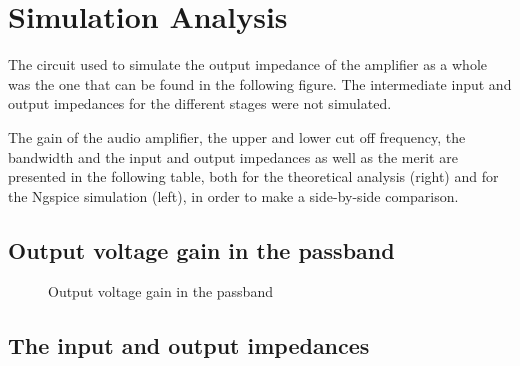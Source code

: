 \section{Simulation Analysis}
\label{sec:simulation}

The circuit used to simulate the output impedance of the amplifier as a whole was the one that can be found in the following figure. The intermediate input and output impedances for the different stages were not simulated.



The gain of the audio amplifier, the upper and lower cut off frequency, the bandwidth and the input and output impedances as well as the merit are presented in the following table, both for the theoretical analysis (right) and for the Ngspice simulation (left), in order to make a side-by-side comparison.

%    

  

\subsection{Output voltage gain in the passband}
\par
\vspace{-4cm}
\begin{figure}[H] \centering
\vspace{-1cm}
\caption{Output voltage gain in the passband}
\label{fig:gain_sim}
\end{figure}


\subsection{The input and output impedances}

